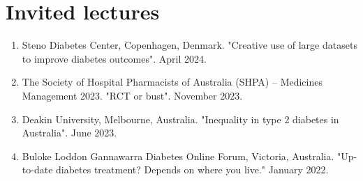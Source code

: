 \documentclass[11pt]{article}
\begin{document}
\section*{Invited lectures}
\begin{enumerate}
\item Steno Diabetes Center, Copenhagen, Denmark. "Creative use of large datasets to improve diabetes outcomes". April 2024.
\item The Society of Hospital Pharmacists of Australia (SHPA) – Medicines Management 2023. "RCT or bust". November 2023.
\item Deakin University, Melbourne, Australia. "Inequality in type 2 diabetes in Australia". June 2023. 
\item Buloke Loddon Gannawarra Diabetes Online Forum, Victoria, Australia. "Up-to-date diabetes treatment? Depends on where you live." January 2022.  
\end{enumerate}
\end{document}
